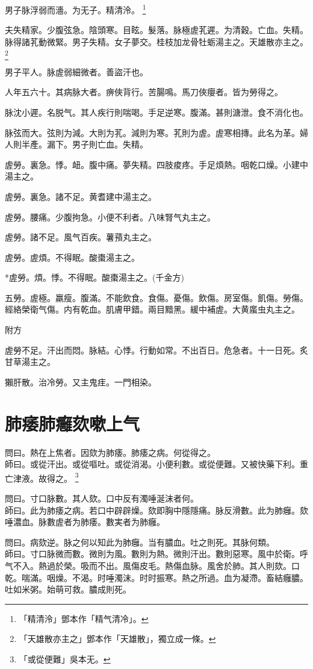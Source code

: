 \documentclass[b5paper,twoside,zihao=-4,UTF8]{ctexbook}
\begin{document}
男子脉浮弱而濇。为无子。精清泠。
	\footnote{「精清泠」鄧本作「精气清冷」。}

夫失精家。少腹弦急。陰頭寒。目眩。髮落。脉極虗芤遲。为清穀。亡血。失精。脉得諸芤動微緊。男子失精。女子夢交。桂枝加龙骨牡蛎湯主之。天雄散亦主之。
	\footnote{「天雄散亦主之」鄧本作「天雄散」，獨立成一條。}

男子平人。脉虗弱細微者。善盜汗也。

人年五六十。其病脉大者。痹俠背行。苦腸鳴。馬刀俠癭者。皆为勞得之。

脉沈小遲。名脱气。其人疾行則喘喝。手足逆寒。腹滿。甚則溏泄。食不消化也。

脉弦而大。弦則为減。大則为芤。減則为寒。芤則为虗。虗寒相摶。此名为革。婦人則半產。漏下。男子則亡血。失精。

虗勞。裏急。悸。衄。腹中痛。夢失精。四肢痠疼。手足煩熱。咽乾口燥。小建中湯主之。

虗勞。裏急。諸不足。黄耆建中湯主之。

虗勞。腰痛。少腹拘急。小便不利者。八味腎气丸主之。

虗勞。諸不足。風气百疾。薯蕷丸主之。

虗勞。虗煩。不得眠。酸棗湯主之。

*虗勞。煩。悸。不得眠。酸棗湯主之。(千金方)

五勞。虗極。羸瘦。腹滿。不能飲食。食傷。憂傷。飲傷。房室傷。飢傷。勞傷。經絡榮衛气傷。内有乾血。肌膚甲錯。兩目黯黑。緩中補虗。大黄䗪虫丸主之。

附方

虗勞不足。汗出而悶。脉結。心悸。行動如常。不出百日。危急者。十一日死。炙甘草湯主之。

獺肝散。治冷勞。又主鬼疰。一門相染。

\chapter{肺痿肺癰欬嗽上气}

問曰。熱在上焦者。因欬为肺痿。肺痿之病。何從得之。\\
師曰。或從汗出。或從嘔吐。或從消渴。小便利數。{或從便難。}又被快藥下利。重亡津液。故得之。
	\footnote{「或從便難」吳本无。}

問曰。寸口脉數。其人欬。口中反有濁唾涎沫者何。\\
師曰。{此}为肺痿之病。若口中辟辟燥。欬即胸中隱隱痛。脉反滑數。此为肺癰。欬唾濃血。脉數虗者为肺痿。數実者为肺癰。

問曰。病欬逆。脉之何以知此为肺癰。当有膿血。吐之則死。其脉何類。\\
師曰。寸口脉微而數。微則为風。數則为熱。微則汗出。數則惡寒。風中於衛。呼气不入。熱過於榮。吸而不出。風傷皮毛。熱傷血脉。風舍於肺。其人則欬。口乾。喘滿。咽燥。不渴。时唾濁沫。时时振寒。熱之所過。血为凝滯。畜結癰膿。吐如米粥。始萌可救。膿成則死。
\end{document}
